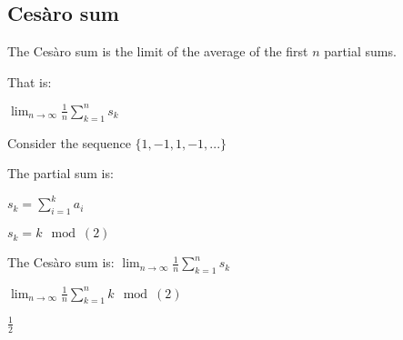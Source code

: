 
\subsection{Cesàro sum}

The Cesàro sum is the limit of the average of the first \(n\) partial sums.

That is:

\(\lim_{n\rightarrow \infty }\frac{1}{n}\sum_{k=1}^ns_k\)

Consider the sequence \(\{1,-1,1,-1,...\}\)

The partial sum is:

\(s_k=\sum_{i=1}^ka_i\)

\(s_k=k\mod(2)\)

The Cesàro sum is:
\(\lim_{n\rightarrow \infty }\frac{1}{n}\sum_{k=1}^ns_k\)

\(\lim_{n\rightarrow \infty }\frac{1}{n}\sum_{k=1}^nk\mod(2)\)

\(\frac{1}{2}\)

